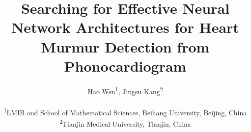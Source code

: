 \documentclass[twocolumn]{cinc}
\title{Searching for Effective Neural Network Architectures for Heart Murmur Detection from Phonocardiogram}
\author{Hao Wen\textsuperscript{1},
Jingsu Kang\textsuperscript{2} \\ \ \\
\textsuperscript{1}LMIB and School of Mathematical Sciences, Beihang University, Beijing, China\\
\textsuperscript{2}Tianjin Medical University, Tianjin, China
}
\begin{document}
\maketitle
















% 






\balance
\end{document}
